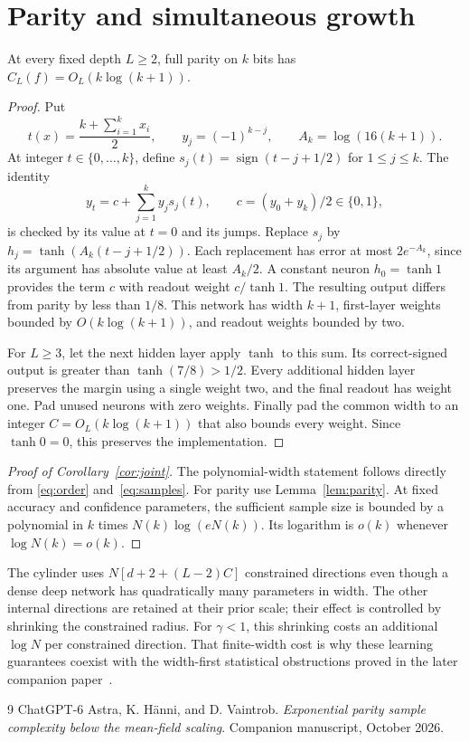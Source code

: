 \documentclass[11pt]{article}
\theoremstyle{remark}\newtheorem{remark}[theorem]{Remark}
\begin{document}
\section{Parity and simultaneous growth}
\begin{lemma}\label{lem:parity}
At every fixed depth $L\ge2$, full parity on $k$ bits has
$C_L(f)=O_L(k\log(k+1))$.
\end{lemma}
\begin{proof}
Put
\[
 t(x)=\frac{k+\sum_{i=1}^k x_i}{2},\qquad
 y_j=(-1)^{k-j},\qquad A_k=\log(16(k+1)).
\]
At integer $t\in\{0,\ldots,k\}$, define
$s_j(t)=\operatorname{sign}(t-j+1/2)$ for $1\le j\le k$.
The identity
\[
 y_t=c+\sum_{j=1}^k y_js_j(t),\qquad c=(y_0+y_k)/2\in\{0,1\},
\]
is checked by its value at $t=0$ and its jumps.
Replace $s_j$ by $h_j=\tanh(A_k(t-j+1/2))$.
Each replacement has error at most $2e^{-A_k}$, since its argument
has absolute value at least $A_k/2$. A constant neuron $h_0=\tanh1$
provides the term $c$ with readout weight $c/\tanh1$.
The resulting output differs from parity by less than $1/8$.
This network has width $k+1$, first-layer weights bounded by
$O(k\log(k+1))$, and readout weights bounded by two.

For $L\ge3$, let the next hidden layer apply $\tanh$ to this sum.
Its correct-signed output is greater than $\tanh(7/8)>1/2$.
Every additional hidden layer preserves the margin using a single
weight two, and the final readout has weight one. Pad unused neurons
with zero weights. Finally pad the common width to an integer
$C=O_L(k\log(k+1))$ that also bounds every weight. Since $\tanh0=0$,
this preserves the implementation.
\end{proof}

\begin{proof}[Proof of Corollary~\ref{cor:joint}]
The polynomial-width statement follows directly from
\eqref{eq:order} and~\eqref{eq:samples}. For parity use
Lemma~\ref{lem:parity}. At fixed accuracy and confidence parameters, the
sufficient sample size is bounded by a polynomial in $k$ times
$N(k)\log(eN(k))$. Its logarithm is $o(k)$ whenever
$\log N(k)=o(k)$.
\end{proof}

The cylinder uses $N[d+2+(L-2)C]$ constrained directions even though a
dense deep network has quadratically many parameters in width. The other
internal directions are retained at their prior scale; their effect is
controlled by shrinking the constrained radius. For $\gamma<1$, this
shrinking costs an additional $\log N$ per constrained direction.
That finite-width cost is why these learning guarantees coexist with
the width-first statistical obstructions proved in the later
companion paper~\cite{subcritical-exponential}.
\begin{thebibliography}{9}
ChatGPT-6 Astra, K. H\"anni, and D. Vaintrob.
\emph{Exponential parity sample complexity below the mean-field scaling}.
Companion manuscript, October 2026.
\end{thebibliography}
\end{document}

